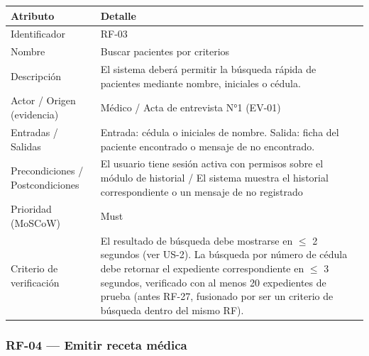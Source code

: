 \documentclass[11pt,a4paper]{article}
\begin{document}
	\begin{longtable}{p{} p{}}
		
		\toprule
		\textbf{Atributo} & \textbf{Detalle} \\
		\midrule
		\endhead
		
		Identificador & RF-03 \\
		Nombre & Buscar pacientes por criterios \\
		Descripción & El sistema deberá permitir la búsqueda rápida de pacientes mediante nombre, iniciales o cédula. \\
		Actor / Origen (evidencia) & Médico / Acta de entrevista N°1 (EV-01) \\
		Entradas / Salidas & Entrada: cédula o iniciales de nombre. Salida: ficha del paciente encontrado o mensaje de no encontrado. \\
		Precondiciones / Postcondiciones & El usuario tiene sesión activa con permisos sobre el módulo de historial / El sistema muestra el historial correspondiente o un mensaje de no registrado \\
		Prioridad (MoSCoW) & Must \\
		Criterio de verificación & El resultado de búsqueda debe mostrarse en \(\leq\) 2 segundos (ver US-2). La búsqueda por número de cédula debe retornar el expediente correspondiente en \(\leq\) 3 segundos, verificado con al menos 20 expedientes de prueba (antes RF-27, fusionado por ser un criterio de búsqueda dentro del mismo RF). \\
		
		\bottomrule
		
	\end{longtable}
	
	\subsubsection{RF-04 --- Emitir receta médica}
	
\end{document}

